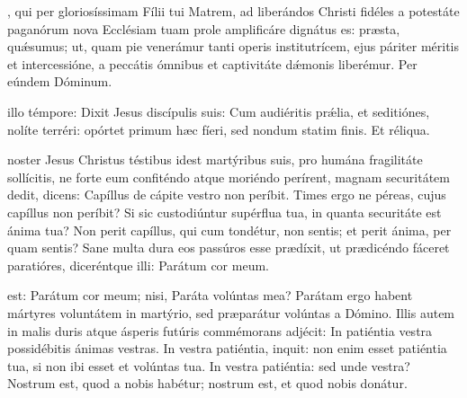 \documentclass[fontsize=9pt,paper=A6,twoside,BCOR=1mm,DIV=22,headinclude]{scrarticle}
\begin{document}
\begin{multicols}{2}
\VRBMVi

, qui per gloriosíssimam Fílii tui Matrem, ad liberándos Christi fidéles a potestáte paganórum nova Ecclésiam tuam prole amplificáre dignátus es: præsta, quǽsumus; ut, quam pie venerámur tanti operis institutrícem, ejus páriter méritis et intercessióne, a peccátis ómnibus et captivitáte dǽmonis liberémur. Per eúndem Dóminum.


 illo témpore: Dixit Jesus discípulis suis: Cum audiéritis pr\'ælia, et seditiónes, nolíte terréri: opórtet primum hæc fíeri, sed nondum statim finis. Et réliqua.

 noster Jesus Christus téstibus idest martýribus suis, pro humána fragilitáte sollícitis, ne forte eum confiténdo atque moriéndo perírent, magnam securitátem dedit, dicens: Capíllus de cápite vestro non períbit. Times ergo ne péreas, cujus capíllus non períbit? Si sic custodiúntur supérflua tua, in quanta securitáte est ánima tua? Non perit capíllus, qui cum tondétur, non sentis; et perit ánima, per quam sentis? Sane multa dura eos passúros esse prædíxit, ut prædicéndo fáceret paratióres, diceréntque illi: Parátum cor meum.

\RVMmvii

 est: Parátum cor meum; nisi, Paráta volúntas mea? Parátam ergo habent mártyres voluntátem in martýrio, sed præparátur volúntas a Dómino. Illis autem in malis duris atque ásperis futúris commémorans adjécit: In patiéntia vestra possidébitis ánimas vestras. In vestra patiéntia, inquit: non enim esset patiéntia tua, si non ibi esset et volúntas tua. In vestra patiéntia: sed unde vestra? Nostrum est, quod a nobis habétur; nostrum est, et quod nobis donátur.

\RVMmviii


\end{multicols}
\end{document}
